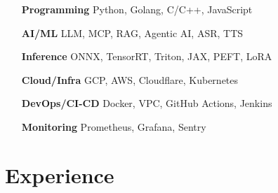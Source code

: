\documentclass[letterpaper,10pt]{article}
\newcommand{\heading}[2]{
  \hspace{10pt}#1\hfill#2\\
}
\newcommand{\headingBf}[2]{
  \heading{\textbf{#1}}{\textbf{#2}}
}
\newcommand{\headingIt}[2]{
  \heading{\textit{#1}}{\textit{#2}}
}
\newenvironment{resume_list}{
  \vspace{-7pt}
  \begin{itemize}[itemsep=-2px, parsep=1pt, leftmargin=30pt]
}{
  \end{itemize}
}
\begin{document}
\begin{multicols}{2}
  \begin{itemize}[itemsep=-2px, parsep=1pt, leftmargin=75pt]
    \item[\textbf{Programming}] Python, Golang, C/C++, JavaScript
    \item[\textbf{AI/ML}] LLM, MCP, RAG, Agentic AI, ASR, TTS
    \item[\textbf{Inference}] ONNX, TensorRT, Triton, JAX, PEFT, LoRA
    \item[\textbf{Cloud/Infra}] GCP, AWS, Cloudflare, Kubernetes
    \item[\textbf{DevOps/CI-CD}] Docker, VPC, GitHub Actions, Jenkins
    \item[\textbf{Monitoring}] Prometheus, Grafana, Sentry
  \end{itemize}
\end{multicols}



  \section{Experience}





\end{document}

